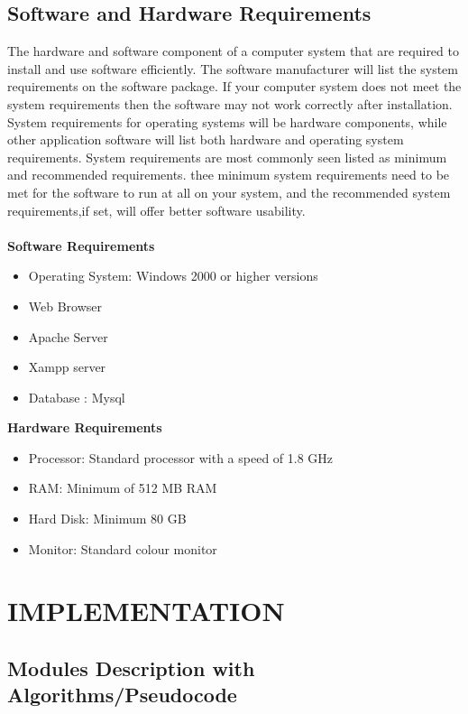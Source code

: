 \documentclass[12pt,a4paper]{report}
\begin{document}
\begin{titlepage}
{\section{ Software and Hardware Requirements }
\vspace{0.5cm}
The hardware and software component of a computer system that are required to install and use software efficiently. The software manufacturer will list the system requirements on the software package. If your computer system does not meet the system requirements then the software may not work correctly after
installation.\\
System requirements for operating systems will be hardware components, while  other application software will  list both hardware and operating  system requirements. System requirements are most commonly seen listed as minimum and recommended requirements. thee minimum system requirements need to be met for the software to run at all on your system, and the recommended system requirements,if set, will offer better software usability.\\ \\
\vspace{0.75cm}
\textbf{Software Requirements}
\vspace{0.5cm}
\begin{itemize}
	\item Operating System: Windows 2000 or higher versions
	\item Web Browser
	\item Apache Server
	\item Xampp server
	\item Database : Mysql\\
\end{itemize}
\newpage
\textbf{Hardware Requirements}
\vspace{0.5cm}
\begin{itemize}
	\item Processor: Standard processor with a speed of 1.8 GHz
	\item RAM: Minimum of 512 MB RAM
	\item Hard Disk: Minimum 80 GB
	\item Monitor: Standard colour monitor
\end{itemize}
\newpage
\chapter{ IMPLEMENTATION }
\section{Modules Description with Algorithms/Pseudocode}
\vspace{0.5cm}
}
\end{titlepage}
\end{document}
